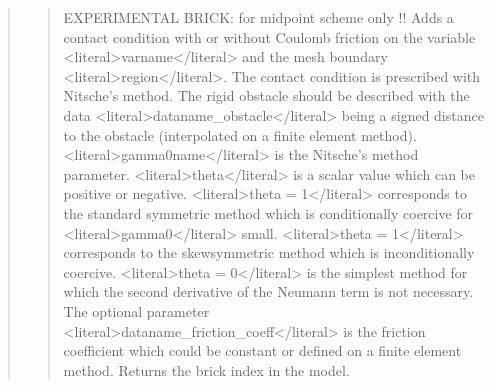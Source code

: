 \documentclass[a4paper,11pt,english]{sphinxmanual}
\begin{document}
\begin{quote}
\begin{quote}
\sphinxAtStartPar
EXPERIMENTAL BRICK: for midpoint scheme only !!
Adds a contact condition with or without Coulomb friction on the variable
\textless{}literal\textgreater{}varname\textless{}/literal\textgreater{} and the mesh boundary \textless{}literal\textgreater{}region\textless{}/literal\textgreater{}. The contact condition
is prescribed with Nitsche’s method. The rigid obstacle should
be described with the data \textless{}literal\textgreater{}dataname\_obstacle\textless{}/literal\textgreater{} being a signed distance to
the obstacle (interpolated on a finite element method).
\textless{}literal\textgreater{}gamma0name\textless{}/literal\textgreater{} is the Nitsche’s method parameter.
\textless{}literal\textgreater{}theta\textless{}/literal\textgreater{} is a scalar value which can be
positive or negative. \textless{}literal\textgreater{}theta = 1\textless{}/literal\textgreater{} corresponds to the standard symmetric
method which is conditionally coercive for  \textless{}literal\textgreater{}gamma0\textless{}/literal\textgreater{} small.
\textless{}literal\textgreater{}theta = \sphinxhyphen{}1\textless{}/literal\textgreater{} corresponds to the skew\sphinxhyphen{}symmetric method which is
inconditionally coercive. \textless{}literal\textgreater{}theta = 0\textless{}/literal\textgreater{} is the simplest method
for which the second derivative of the Neumann term is not necessary.
The optional parameter \textless{}literal\textgreater{}dataname\_friction\_coeff\textless{}/literal\textgreater{} is the friction
coefficient which could be constant or defined on a finite element
method.
Returns the brick index in the model.
\end{quote}

\sphinxAtStartPar
{}
\begin{quote}


\end{quote}
\end{quote}
\end{document}
